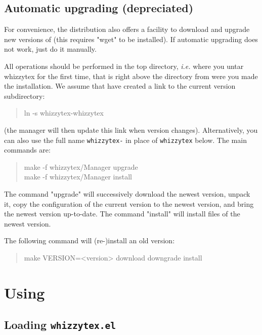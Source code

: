 \documentclass[12pt]{article}
\begin{document}
\subsection {Automatic upgrading (depreciated)}

For convenience, the distribution also offers a facility to download and
upgrade new versions of {\whizzy} (this requires \lst"wget" to be
installed).  If automatic upgrading does not work, just do it manually.

All operations should be performed in the {\whizzy} top directory, {\em
i.e.} where you untar whizzytex for the first time, that is right above the
directory from were you made the installation. We assume that have
created a link to the current version subdirectory:
\begin{quote}
\begin{tt}
ln -s whizzytex-\version\space whizzytex
\end{tt}
\end{quote}
(the manager will then update this link when version changes).
Alternatively, you can also use the full name {\tt whizzytex-\version} in
place of {\tt whizzytex} below. The main commands are:
\begin{quote}
\begin{tt}
make -f whizzytex/Manager upgrade \\
make -f whizzytex/Manager install
\end{tt}
\end{quote}
The command \lst"upgrade" will successively download the newest version,
unpack it, copy the configuration of the current version to the newest
version, and bring the newest version up-to-date. The command \lst"install"
will install files of the newest version.

The following command will (re-)install an old version:
\begin{quote}
\begin{tt}
make VERSION=<version> download downgrade install
\end{tt}
\end{quote}

\section{Using {\protect\whizzy}}
\label{using}

\subsection {Loading {\tt whizzytex.el}}
\end{document}
